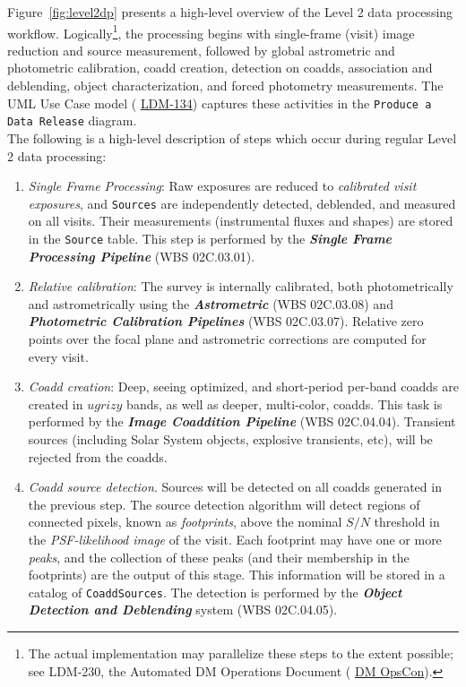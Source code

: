 \documentclass[12pt]{article}
\newcommand{\code}[1]{\texttt{#1}}
\newcommand{\Source}{\code{Source}\xspace}
\newcommand{\Sources}{\code{Sources}\xspace}
\newcommand{\CoaddSources}{\code{CoaddSources}\xspace}
\newcommand{\ds}[2]{{\color{blue} \href{https://docushare.lsstcorp.org/docushare/dsweb/Get/#1}{#2}}\xspace}
\newcommand{\appsUMLusecase}{\ds{LDM-134}{LDM-134}}
\newcommand{\DMOps}{\ds{LDM-230}{DM OpsCon}}
\newcommand{\wbsSFM}{WBS 02C.03.01}
\newcommand{\wbsCoadd}{WBS 02C.04.04}
\newcommand{\wbsDetDeblend}{WBS 02C.04.05}
\newcommand{\wbsPhotoCal}{WBS 02C.03.07}
\newcommand{\wbsAstroCal}{WBS 02C.03.08}
\newcommand{\uc}[1]{{\tt #1}}
\begin{document}
Figure~\ref{fig:level2dp} presents a high-level overview of the Level 2 data processing workflow. Logically\footnote{The actual implementation may parallelize these steps to the extent possible; see LDM-230, the Automated DM Operations Document (\DMOps).}, the processing begins with single-frame (visit) image reduction and source measurement, followed by global astrometric and photometric calibration, coadd creation, detection on coadds, association and deblending, object characterization, and forced photometry measurements. The UML Use Case model (\appsUMLusecase) captures these activities in the \uc{Produce a Data Release} diagram.
\\

The following is a high-level description of steps which occur during regular Level 2 data processing:
\begin{enumerate}
    \item {\em Single Frame Processing}: Raw exposures are reduced to {\em calibrated visit exposures}, and \Sources are independently detected, deblended, and measured on all visits. Their measurements (instrumental fluxes and shapes) are stored in the \Source table. This step is performed by the {\bf \em Single Frame Processing Pipeline} (\wbsSFM).
    \item {\em Relative calibration}: The survey is internally calibrated, both photometrically and astrometrically using the {\bf \em Astrometric} (\wbsAstroCal) and {\bf \em Photometric Calibration Pipelines} (\wbsPhotoCal). Relative zero points over the focal plane and astrometric corrections are computed for every visit.
    \item {\em Coadd creation}: Deep, seeing optimized, and short-period per-band coadds are created in $ugrizy$ bands, as well as deeper, multi-color, coadds. This task is performed by the {\bf \em Image Coaddition Pipeline} (\wbsCoadd). Transient sources (including Solar System objects, explosive transients, etc), will be rejected from the coadds.
    \item {\em Coadd source detection}. Sources will be detected on all coadds generated in the previous step. The source detection algorithm will detect regions of connected pixels, known as {\em footprints}, above the nominal $S/N$ threshold in the {\em PSF-likelihood image} of the visit. Each footprint may have one or more {\em peaks}, and the collection of these peaks (and their membership in the footprints) are the output of this stage. This information will be stored in a catalog of \CoaddSources. The detection is performed by the {\bf \em Object Detection and Deblending} system (\wbsDetDeblend).

\end{enumerate}
\end{document}
